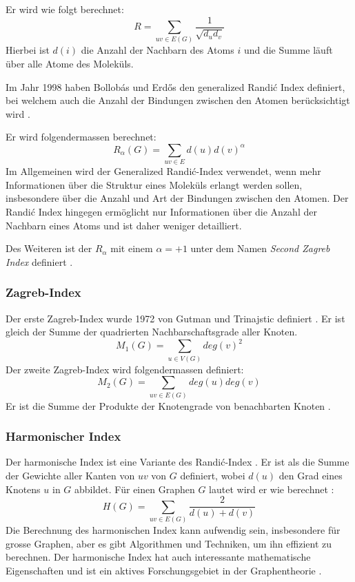 Er wird wie folgt berechnet:
\begin{equation}
    R = \sum_{uv \in E(G)}\frac{1}{\sqrt{d_u d_v}}
\end{equation}
Hierbei ist $d(i)$ die Anzahl der Nachbarn des Atoms $i$ und die Summe läuft über alle Atome des Moleküls.

Im Jahr 1998 haben Bollobás und Erdős den generalized Randić Index definiert, bei welchem auch die Anzahl der Bindungen zwischen den Atomen berücksichtigt wird \cite{li_survey_2008}.

Er wird folgendermassen berechnet:
\begin{equation}
    R_{\alpha}(G) = \sum_{uv \in E}{d(u) d(v)}^{\alpha}
\end{equation}
Im Allgemeinen wird der Generalized Randić-Index verwendet, wenn mehr Informationen über die Struktur eines Moleküls erlangt werden sollen, insbesondere über die Anzahl und Art der Bindungen zwischen den Atomen.
Der Randić Index hingegen ermöglicht nur Informationen über die Anzahl der Nachbarn eines Atoms und ist daher weniger detailliert.

Des Weiteren ist der $R_{\alpha}$ mit einem $\alpha = +1$ unter dem Namen \textit{Second Zagreb Index} definiert \cite{li_survey_2008}.

\subsubsection{Zagreb-Index}

Der erste Zagreb-Index wurde 1972 von Gutman und Trinajstic definiert \cite{xu_zagreb_2011}.
Er ist gleich der Summe der quadrierten Nachbarschaftsgrade aller Knoten.
\begin{equation}
    M_1(G) = \sum_{u \in V (G)} deg(v)^2
\end{equation}
Der zweite Zagreb-Index wird folgendermassen definiert:
\begin{equation}
    M_2(G) = \sum_{uv \in E (G)} deg(u) deg(v)
\end{equation}
Er ist die Summe der Produkte der Knotengrade von benachbarten Knoten \cite{das_zagreb_2015}.

\subsubsection{Harmonischer Index}

Der harmonische Index ist eine Variante des Randić-Index \cite[p.~562]{zhong_harmonic_2012}.
Er ist als die Summe der Gewichte aller Kanten von $uv$ von $G$ definiert, wobei $d(u)$ den Grad eines Knotens $u$ in $G$ abbildet.
Für einen Graphen $G$ lautet wird er wie berechnet \cite[p.~562]{zhong_harmonic_2012}:
\begin{equation}
    H(G) = \sum_{uv \in E (G)} \frac{2}{d(u) + d(v)}
\end{equation}
Die Berechnung des harmonischen Index kann aufwendig sein, insbesondere für grosse Graphen, aber es gibt Algorithmen und Techniken, um ihn effizient zu berechnen. 
Der harmonische Index hat auch interessante mathematische Eigenschaften und ist ein aktives Forschungsgebiet in der Graphentheorie \cite{li_harmonic_2014}.

